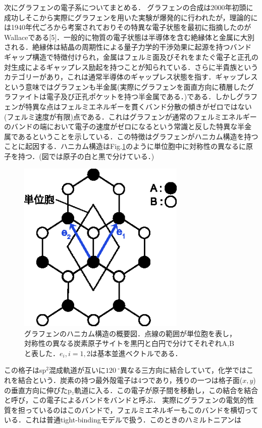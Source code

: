 次にグラフェンの電子系についてまとめる．
グラフェンの合成は2000年初頭に成功しそこから実際にグラフェンを用いた実験が爆発的に行われたが，理論的には1940年代ごろから考案されておりその特異な電子状態を最初に指摘したのがWallaceである[5]．一般的に物質の電子状態は半導体を含む絶縁体と金属に大別される．絶縁体は結晶の周期性による量子力学的干渉効果に起源を持つバンドギャップ構造で特徴付けられ，金属はフェルミ面及びそれをまたぐ電子と正孔の対生成によるギャップレス励起を持つことが知られている．さらに半貴族というカテゴリーがあり，これは通常半導体のギャップレス状態を指す．ギャップレスという意味ではグラフェンも半金属(実際にグラフェンを面直方向に積層したグラファイトは電子及び正孔ポケットを持つ半金属である．)である．しかしグラフェンが特異な点はフェルミエネルギーを貫くバンド分散の傾きがゼロではない(フェルミ速度が有限)点である．これはグラフェンが通常のフェルミエネルギーのバンドの端において電子の速度がゼロになるという常識と反した特異な半金属であるということを示している．この特徴はグラフェンがハニカム構造を持つことに起因する．ハニカム構造はFig.\ref{fig:graphene_vector}のように単位胞中に対称性の異なるに原子を持つ．(図では原子の白と黒で分けている．)

\begin{figure}[t]
 \begin{center}
  \includegraphics[width=80mm]{images/graphene_vector.eps}
  \end{center}
   \caption{グラフェンのハニカム構造の概要図．点線の範囲が単位胞を表し，対称性の異なる炭素原子サイトを黒円と白円で分けてそれぞれA,Bと表した．$e_{i},i=1,2$は基本並進ベクトルである．}
 \label{fig:graphene_vector}
\end{figure}

この格子はsp$^{2}$混成軌道が互いに$120\ ^{\circ}$異なる三方向に結合していて，化学ではこれを\sigma 結合という．炭素の持つ最外殻電子は4つであり，残りの一つは格子面($x,y$)の垂直方向に伸びたp$_{z}$軌道に入る．この電子が原子間を移動し，この結合を\pi 結合と呼び，この電子によるバンドを\pi バンドと呼ぶ．
実際にグラフェンの電気的性質を担っているのはこの\pi バンドで，フェルミエネルギーもこの\pi バンドを横切っている．これは普通tight-bindingモデルで扱う．このときのハミルトニアンは

